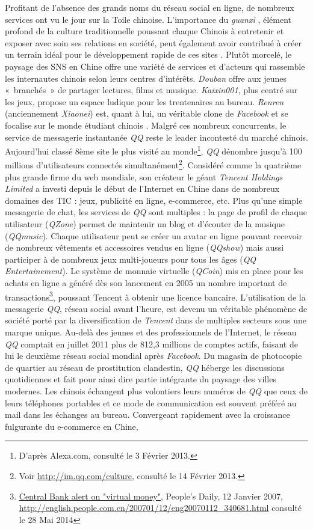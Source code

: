 Profitant de l’absence des grands noms du réseau social en ligne, de nombreux services ont vu le jour sur la Toile chinoise. L'importance du \textit{guanxi} \citep{Yu2008}, élément profond de la culture traditionnelle poussant chaque Chinois à entretenir et exposer avec soin ses relations en société, peut également avoir contribué à créer un terrain idéal pour le développement rapide de ces sites \citep{Arbor2011}. Plutôt morcelé, le paysage des SNS en Chine offre une variété de services et d’acteurs qui rassemble les internautes chinois selon leurs centres d'intérêts. \textit{Douban} offre aux jeunes « branchés » de partager lectures, films et musique. \textit{Kaixin001}, plus centré sur les jeux, propose un espace ludique pour les trentenaires au bureau. \textit{Renren} (anciennement \textit{Xiaonei}) est, quant à lui, un véritable clone de \textit{Facebook} et se focalise sur le monde étudiant chinois \citep{Renaud2011}. Malgré ces nombreux concurrents, le service de messagerie instantanée \textit{QQ} reste le leader incontesté du marché chinois. Aujourd’hui classé 8ème site le plus visité au monde\footnote{D’après Alexa.com, consulté le 3 Février 2013.}, \textit{QQ} dénombre jusqu’à 100 millions d’utilisateurs connectés simultanément\footnote{Voir \url{http://im.qq.com/culture}, consulté le 14 Février 2013.}. Considéré comme la quatrième plus grande firme du web mondiale, son créateur le géant \textit{Tencent Holdings Limited} a investi depuis le début de l’Internet en Chine dans de nombreux domaines des TIC : jeux, publicité en ligne, e-commerce, etc. Plus qu’une simple messagerie de chat, les services de \textit{QQ} sont multiples : la page de profil de chaque utilisateur (\textit{QZone}) permet de maintenir un blog et d’écouter de la musique (\textit{QQmusic}). Chaque utilisateur peut se créer un avatar en ligne pouvant recevoir de nombreux vêtements et accessoires vendus en ligne (\textit{QQshow}) mais aussi participer à de nombreux jeux multi-joueurs pour tous les âges (\textit{QQ Entertainement}). Le système de monnaie virtuelle (\textit{QCoin}) mis en place pour les achats en ligne a généré dès son lancement en 2005 un nombre important de transactions\footnote{\url{Central Bank alert on "virtual money"}, People’s Daily, 12 Janvier 2007, \url{http://english.people.com.cn/200701/12/eng20070112_340681.html} consulté le 28 Mai 2014}, poussant Tencent à obtenir une licence bancaire. L’utilisation de la messagerie \textit{QQ}, réseau social avant l’heure, est devenu un véritable phénomène de société porté par la diversification de \textit{Tencent} dans de multiples secteurs sous une marque unique. Au-delà des jeunes et des professionnels de l’Internet, le réseau \textit{QQ} comptait en juillet 2011 plus de 812,3 millions de comptes actifs, faisant de lui le deuxième réseau social mondial après \textit{Facebook}. Du magasin de photocopie de quartier au réseau de prostitution clandestin, \textit{QQ} héberge les discussions quotidiennes et fait pour ainsi dire partie intégrante du paysage des villes modernes. Les chinois échangent plus volontiers leurs numéros de \textit{QQ} que ceux de leurs téléphones portables et ce mode de communication est souvent préféré au mail dans les échanges au bureau. Convergeant rapidement avec la croissance fulgurante du e-commerce en Chine, 